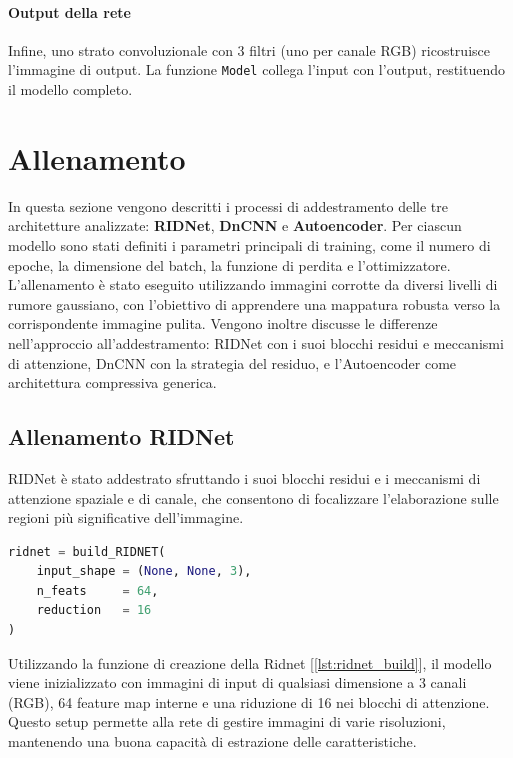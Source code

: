 \documentclass[12pt,a4paper,openright,twoside]{book}
\begin{document}
\paragraph{Output della rete}
Infine, uno strato convoluzionale con 3 filtri (uno per canale RGB) ricostruisce l'immagine di output.  
La funzione \texttt{Model} collega l'input con l'output, restituendo il modello completo. 

\section{Allenamento}
In questa sezione vengono descritti i processi di addestramento delle tre architetture analizzate: \textbf{RIDNet}, \textbf{DnCNN} e \textbf{Autoencoder}.  
Per ciascun modello sono stati definiti i parametri principali di training, come il numero di epoche, la dimensione del batch, la funzione di perdita e l'ottimizzatore.  
L'allenamento è stato eseguito utilizzando immagini corrotte da diversi livelli di rumore gaussiano, con l'obiettivo di apprendere una mappatura robusta verso la corrispondente immagine pulita.  
Vengono inoltre discusse le differenze nell'approccio all'addestramento: RIDNet con i suoi blocchi residui e meccanismi di attenzione, DnCNN con la strategia del residuo, e l'Autoencoder come architettura compressiva generica.  

\subsection*{Allenamento RIDNet}
RIDNet è stato addestrato sfruttando i suoi blocchi residui e i meccanismi di attenzione spaziale e di canale, che consentono di focalizzare l'elaborazione sulle regioni più significative dell'immagine.  

\begin{lstlisting}[language=Python, caption={Creazione della Ridnet}, label={lst:ridnet_build}]
ridnet = build_RIDNET(
    input_shape = (None, None, 3), 
    n_feats     = 64, 
    reduction   = 16
)
\end{lstlisting}
Utilizzando la funzione di creazione della Ridnet [\ref{lst:ridnet_build}], il modello viene inizializzato con immagini di input di qualsiasi dimensione a 3 canali (RGB), 64 feature map interne e una riduzione di 16 nei blocchi di attenzione.
Questo setup permette alla rete di gestire immagini di varie risoluzioni, mantenendo una buona capacità di estrazione delle caratteristiche.
\end{document}
